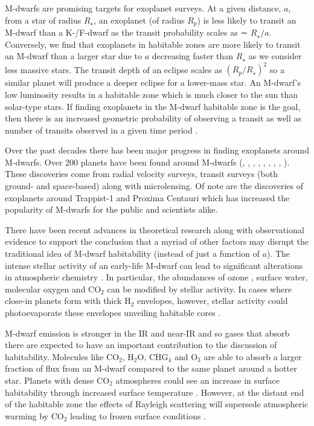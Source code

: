 M-dwarfs are promising targets for exoplanet surveys. At a given distance, $a$, from a star of radius $R_\star$, an exoplanet (of radius $R_p$) is less likely to transit an M-dwarf than a K-/F-dwarf as the transit probability scales as ∼ $R_\star /a$. Conversely, we find that exoplanets in habitable zones are more likely to transit an M-dwarf than a larger star due to $a$ decreasing faster than $R_\star$ as we consider less massive stars. The transit depth of an eclipse scales as $(R_p/R_\star)^2$ so a similar planet will produce a deeper eclipse for a lower-mass star. An M-dwarf's low luminosity results in a habitable zone which is much closer to the sun than solar-type stars. If finding exoplanets in the M-dwarf habitable zone is the goal, then there is an increased geometric probability of observing a transit as well as number of transits observed in a given time period \citep{2008PASP..120..317N}. 

Over the past decades there has been major progress in finding exoplanets around M-dwarfs. Over 200 planets have been found around M-dwarfs (\citealt{2013A&A...551A..48A}, \citealt{2014Sci...344..277Q}, \citealt{2014ApJ...784...45R}, \citealt{2015ApJ...800...99T}, \citealt{2015ApJ...804...10C}, \citealt{2015ApJ...809....7B}, \citealt{2016ApJ...818...87S}, \citealt{2016Natur.536..437A}, \citealt{2017Natur.542..456G}). These discoveries come from radial velocity surveys, transit surveys (both ground- and space-based) along with microlensing. Of note are the discoveries of exoplanets around Trappist-1 \citep{2017Natur.542..456G} and Proxima Centauri \citep{2016Natur.536..437A} which has increased the popularity of M-dwarfs for the public and scientists alike. 

There have been recent advances in theoretical research along with observational evidence to support the conclusion that a myriad of other factors may disrupt the traditional idea of M-dwarf habitability (instead of just a function of $a$). The intense stellar activity of an early-life M-dwarf can lead to significant alterations in atmospheric chemistry \citep{2016PhR...663....1S}. In particular, the abundances of ozone \citep{2010AsBio..10..751S}, surface water,  molecular oxygen \citep{2015AsBio..15..119L} and CO$_2$ \citep{2015ApJ...806..249G} can be modified by stellar activity. In cases where close-in planets form with thick H$_2$ envelopes, however, stellar activity could photoevaporate these envelopes unveiling habitable cores \citep{2015AsBio..15..119L}.  

M-dwarf emission is stronger in the IR and near-IR and so gases that absorb there are expected to have an important contribution to the discussion of habitability. Molecules like CO$_2$, H$_2$O, CHG$_4$ and O$_3$ are able to absorb a larger fraction of flux from an M-dwarf compared to the same planet around a hotter star. Planets with dense CO$_2$ atmospheres could see an increase in surface habitability through increased surface temperature \citep{2011mamo.conf..447W}. However, at the distant end of the habitable zone the effects of Rayleigh scattering will supersede atmospheric warming by CO$_2$ leading to frozen surface conditions \citep{2016PhR...663....1S}.

